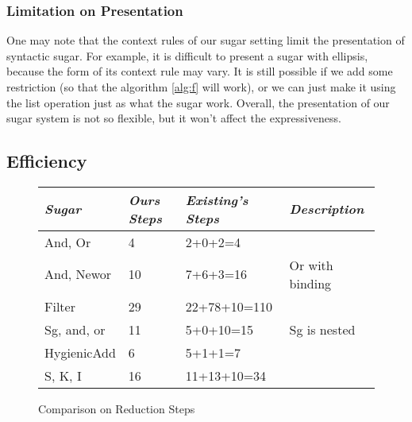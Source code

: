 \subsubsection{Limitation on Presentation}
One may note that the context rules of our sugar setting limit the presentation of syntactic sugar. For example, it is difficult to present a sugar with ellipsis, because the form of its context rule may vary. It is still possible if we add some 
restriction (so that the algorithm \ref{alg:f} will work), or we can just make it using the list operation just as what the sugar  work. Overall, the presentation of our sugar system is not so flexible, but it won't affect the expressiveness. 

\subsection{Efficiency}
\begin{figure}[thb]
  \begin{center}\small
  \begin{tabular}{l | l | l |l}
    \emph{Sugar} & \emph{Ours Steps} & \emph{Existing's Steps} & \emph{Description} \\ \hline
    And, Or & 4  & 2+0+2=4 & \\
    And, Newor & 10 & 7+6+3=16 & Or with binding \\
    Filter & 29 & 22+78+10=110 &  \\
    Sg, and, or & 11 & 5+0+10=15 & Sg is nested \\ 
    HygienicAdd & 6 & 5+1+1=7 &  \\
    S, K, I & 16 & 11+13+10=34 &  \\
  \end{tabular}
  \end{center}
  \caption{Comparison on Reduction Steps}
  \label{fig:step}
  \end{figure}
